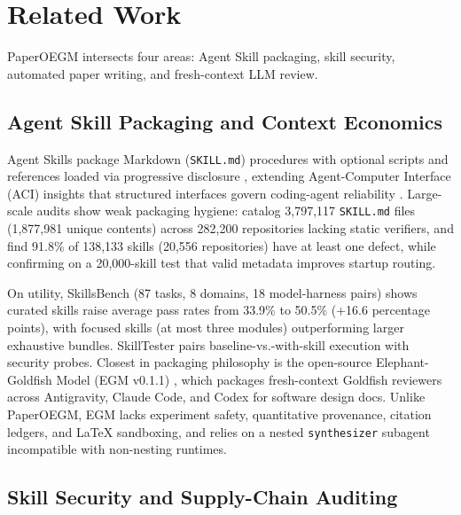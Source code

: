 \section{Related Work}\label{sec:related}

PaperOEGM intersects four areas: Agent Skill packaging, skill security, automated paper writing, and fresh-context LLM review.

\subsection{Agent Skill Packaging and Context Economics}\label{agent-skill-packaging-and-context-economics}

Agent Skills package Markdown (\texttt{SKILL.\allowbreak{}md}) procedures with optional scripts and references loaded via progressive disclosure \citep{xu2026agentskills, destefanis2026gitskills}, extending Agent-Computer Interface (ACI) insights that structured interfaces govern coding-agent reliability \citep{yang2024sweagent}. Large-scale audits show weak packaging hygiene: \citet{destefanis2026gitskills} catalog 3,797,117 \texttt{SKILL.\allowbreak{}md} files (1,877,981 unique contents) across 282,200 repositories lacking static verifiers, and \citet{zhang2026reusable} find 91.8\% of 138,133 skills (20,556 repositories) have at least one defect, while confirming on a 20,000-skill test that valid metadata improves startup routing.

On utility, SkillsBench \citep{li2026skillsbench} (87 tasks, 8 domains, 18 model-harness pairs) shows curated skills raise average pass rates from 33.9\% to 50.5\% (+16.6 percentage points), with focused skills (at most three modules) outperforming larger exhaustive bundles. SkillTester \citep{wang2026skilltester} pairs baseline-vs.-with-skill execution with security probes. Closest in packaging philosophy is the open-source Elephant-Goldfish Model (EGM v0.1.1) \citep{google2026egm}, which packages fresh-context Goldfish reviewers across Antigravity, Claude Code, and Codex for software design docs. Unlike PaperOEGM, EGM lacks experiment safety, quantitative provenance, citation ledgers, and LaTeX sandboxing, and relies on a nested \texttt{synthesizer} subagent incompatible with non-nesting runtimes.

\subsection{Skill Security and Supply-Chain Auditing}\label{skill-security-and-supply-chain-auditing}

